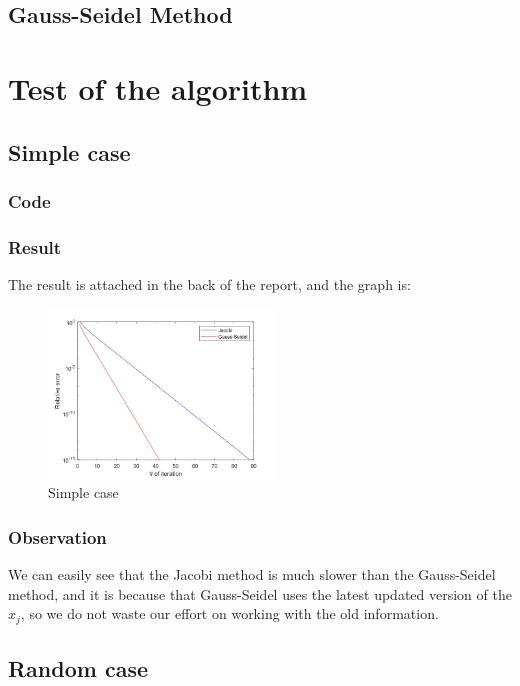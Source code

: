 \documentclass{article}
\begin{document}
\subsection{Gauss-Seidel Method}


\section{Test of the algorithm}
\subsection{Simple case}
\subsubsection{Code}


\subsubsection{Result}
The result is attached in the back of the report, and the graph is:

\begin{figure}[ht]
\centering
  \includegraphics[width = 6cm]{simplecase.jpg}
  \caption {Simple case}
  \end{figure}

 \subsubsection{Observation}
 We can easily see that the Jacobi method is much slower than the Gauss-Seidel method, and it is because that Gauss-Seidel uses the latest updated version of the $x_j$, so we do not waste our effort on working with the old information.
  
\subsection{Random case}
\end{document}
